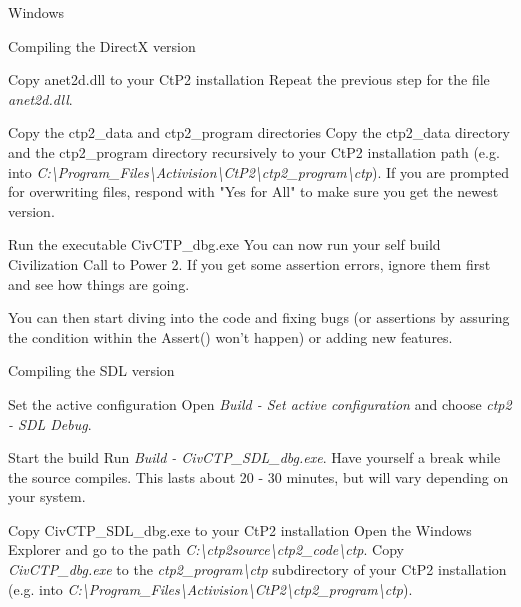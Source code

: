 \begin{section}{Windows}
\begin{subsection}{Compiling the DirectX version}
\begin{subsubsection}{Copy anet2d.dll to your CtP2 installation}
Repeat the previous step for the file \textit{anet2d.dll}.
\end{subsubsection}%

\begin{subsubsection}{Copy the ctp2\_data and ctp2\_program directories}
Copy the ctp2\_data directory and the ctp2\_program directory recursively to your CtP2 installation path (e.g. into \textit{C:\textbackslash{}Program\_Files\textbackslash{}Activision\textbackslash{}CtP2\textbackslash{}ctp2\_program\textbackslash{}ctp}). If you are prompted for overwriting files, respond with "Yes for All" to make sure you get the newest version.
\end{subsubsection}%

\begin{subsubsection}{Run the executable CivCTP\_dbg.exe}
You can now run your self build Civilization Call to Power 2. If you get some assertion errors, ignore them first and see how things are going.

You can then start diving into the code and fixing bugs (or assertions by assuring the condition within the Assert() won't happen) or adding new features.
\end{subsubsection}%

\end{subsection}%

\begin{subsection}{Compiling the SDL version}
\begin{subsubsection}{Set the active configuration}
Open \textit{Build - Set active configuration} and choose \textit{ctp2 - SDL Debug}.
\end{subsubsection}%

\begin{subsubsection}{Start the build}
Run \textit{Build - CivCTP\_SDL\_dbg.exe}. Have yourself a break while the source compiles. This lasts about 20 - 30 minutes, but will vary depending on your system.
\end{subsubsection}%

\begin{subsubsection}{Copy CivCTP\_SDL\_dbg.exe to your CtP2 installation}
Open the Windows Explorer and go to the path \textit{C:\textbackslash{}ctp2source\textbackslash{}ctp2\_code\textbackslash{}ctp}. Copy \textit{CivCTP\_dbg.exe} to the \textit{ctp2\_program\textbackslash{}ctp} subdirectory of your CtP2 installation (e.g. into \textit{C:\textbackslash{}Program\_Files\textbackslash{}Activision\textbackslash{}CtP2\textbackslash{}ctp2\_program\textbackslash{}ctp}).
\end{subsubsection}%


\end{subsection}
\end{section}
